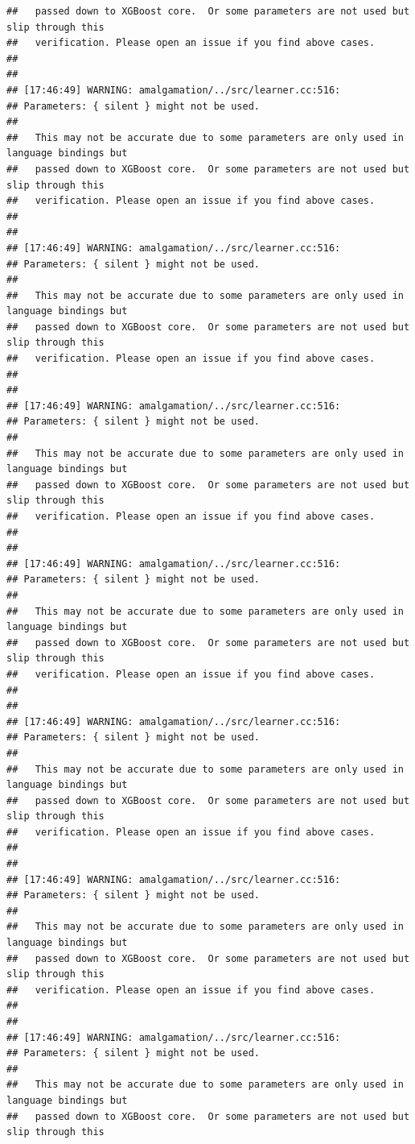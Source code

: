 \documentclass[AMS,STIX2COL]{WileyNJD-v2}\usepackage[]{graphicx}\usepackage[]{color}
\makeatletter
\newenvironment{kframe}{%
 \def\at@end@of@kframe{}%
 \ifinner\ifhmode%
  \def\at@end@of@kframe{\end{minipage}}%
  \begin{minipage}{\columnwidth}%
 \fi\fi%
 \def\FrameCommand##1{\hskip\@totalleftmargin \hskip-\fboxsep
 \colorbox{shadecolor}{##1}\hskip-\fboxsep
     \hskip-\linewidth \hskip-\@totalleftmargin \hskip\columnwidth}%
 \MakeFramed {\advance\hsize-\width
   \@totalleftmargin\z@ \linewidth\hsize
   \@setminipage}}%
 {\par\unskip\endMakeFramed%
 \at@end@of@kframe}
\newenvironment{knitrout}{}{} %
\makeatother
\begin{document}
\begin{knitrout}
\begin{kframe}
\begin{verbatim}
##   passed down to XGBoost core.  Or some parameters are not used but slip through this
##   verification. Please open an issue if you find above cases.
## 
## 
## [17:46:49] WARNING: amalgamation/../src/learner.cc:516: 
## Parameters: { silent } might not be used.
## 
##   This may not be accurate due to some parameters are only used in language bindings but
##   passed down to XGBoost core.  Or some parameters are not used but slip through this
##   verification. Please open an issue if you find above cases.
## 
## 
## [17:46:49] WARNING: amalgamation/../src/learner.cc:516: 
## Parameters: { silent } might not be used.
## 
##   This may not be accurate due to some parameters are only used in language bindings but
##   passed down to XGBoost core.  Or some parameters are not used but slip through this
##   verification. Please open an issue if you find above cases.
## 
## 
## [17:46:49] WARNING: amalgamation/../src/learner.cc:516: 
## Parameters: { silent } might not be used.
## 
##   This may not be accurate due to some parameters are only used in language bindings but
##   passed down to XGBoost core.  Or some parameters are not used but slip through this
##   verification. Please open an issue if you find above cases.
## 
## 
## [17:46:49] WARNING: amalgamation/../src/learner.cc:516: 
## Parameters: { silent } might not be used.
## 
##   This may not be accurate due to some parameters are only used in language bindings but
##   passed down to XGBoost core.  Or some parameters are not used but slip through this
##   verification. Please open an issue if you find above cases.
## 
## 
## [17:46:49] WARNING: amalgamation/../src/learner.cc:516: 
## Parameters: { silent } might not be used.
## 
##   This may not be accurate due to some parameters are only used in language bindings but
##   passed down to XGBoost core.  Or some parameters are not used but slip through this
##   verification. Please open an issue if you find above cases.
## 
## 
## [17:46:49] WARNING: amalgamation/../src/learner.cc:516: 
## Parameters: { silent } might not be used.
## 
##   This may not be accurate due to some parameters are only used in language bindings but
##   passed down to XGBoost core.  Or some parameters are not used but slip through this
##   verification. Please open an issue if you find above cases.
## 
## 
## [17:46:49] WARNING: amalgamation/../src/learner.cc:516: 
## Parameters: { silent } might not be used.
## 
##   This may not be accurate due to some parameters are only used in language bindings but
##   passed down to XGBoost core.  Or some parameters are not used but slip through this

\end{verbatim}
\end{kframe}
\end{knitrout}
\end{document}
